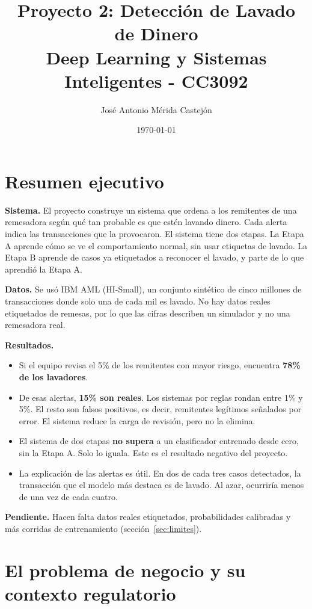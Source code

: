 \documentclass[11pt]{article}
\title{\textbf{Proyecto 2: Detección de Lavado de Dinero} \vspace{1em}\\
  Deep Learning y Sistemas Inteligentes - CC3092}
\author{José Antonio Mérida Castejón}
\date{\today}
\begin{document}
\decimalpoint

\maketitle

\section*{Resumen ejecutivo}

\textbf{Sistema.} El proyecto construye un sistema que ordena a los remitentes de una remesadora según qué tan probable es que estén lavando dinero. Cada alerta indica las transacciones que la provocaron. El sistema tiene dos etapas. La Etapa A aprende cómo se ve el comportamiento normal, sin usar etiquetas de lavado. La Etapa B aprende de casos ya etiquetados a reconocer el lavado, y parte de lo que aprendió la Etapa A.

\textbf{Datos.} Se usó IBM AML (HI-Small), un conjunto sintético de cinco millones de transacciones donde solo una de cada mil es lavado. No hay datos reales etiquetados de remesas, por lo que las cifras describen un simulador y no una remesadora real.

\textbf{Resultados.}
\begin{itemize}
  \item Si el equipo revisa el 5\% de los remitentes con mayor riesgo, encuentra \textbf{78\% de los lavadores}.
  \item De esas alertas, \textbf{15\% son reales}. Los sistemas por reglas rondan entre 1\% y 5\%. El resto son falsos positivos, es decir, remitentes legítimos señalados por error. El sistema reduce la carga de revisión, pero no la elimina.
  \item El sistema de dos etapas \textbf{no supera} a un clasificador entrenado desde cero, sin la Etapa A. Solo lo iguala. Este es el resultado negativo del proyecto.
  \item La explicación de las alertas es útil. En dos de cada tres casos detectados, la transacción que el modelo más destaca es de lavado. Al azar, ocurriría menos de una vez de cada cuatro.
\end{itemize}

\textbf{Pendiente.} Hacen falta datos reales etiquetados, probabilidades calibradas y más corridas de entrenamiento (sección~\ref{sec:limites}).

\section{El problema de negocio y su contexto regulatorio}
\end{document}
